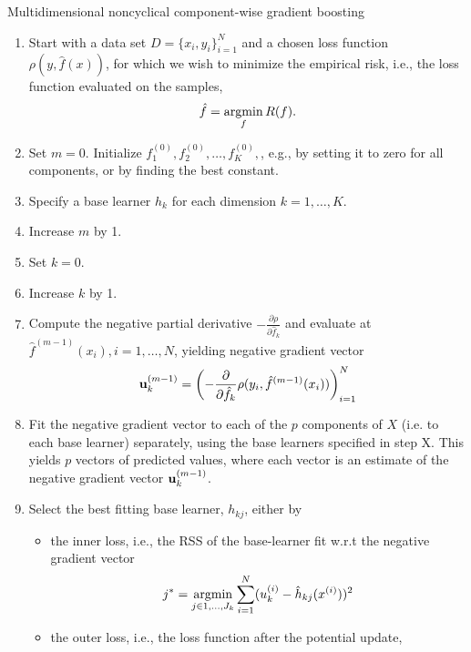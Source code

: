 \begin{algorithm}
\caption{Multidimensional noncyclical component-wise gradient boosting}
\label{algo:multi-noncyclical}
\begin{enumerate}
    \item Start with a data set $D=\{x_i, y_i\}_{i=1}^N$ and a chosen loss function $\rho(y,\hat{f}(x))$, for which we wish to
        minimize the empirical risk, i.e., the loss function evaluated on the samples,
        \begin{equation}
            \hat{f}=\operatorname*{argmin}_{f}R(f).
        \end{equation}
    \item Set $m=0$. Initialize $f^{(0)}_1,f^{(0)}_2,\ldots,f^{(0)}_K,$, e.g., by setting it to zero for all components, or by finding the best constant.%
    \item Specify a base learner $h_k$ for each dimension $k=1,\ldots,K$.
    \item Increase $m$ by 1.
    \item Set $k=0$.
    \item Increase $k$ by 1.
    \item Compute the negative partial derivative $-\frac{\partial\rho}{\partial \hat{f}_k}$
        and evaluate at $\hat{f}^{(m-1)}(x_i),i=1,\ldots,N$, yielding negative gradient vector
        \begin{equation}
            \mathbf{u}^{(m-1)}_k=\left(-\frac{\partial}{\partial \hat{f}_k}\rho(y_i, \hat{f}^{(m-1)}(x_i))\right)_{i=1}^N
        \end{equation}
    \item Fit the negative gradient vector to each of the $p$ components of $X$ (i.e. to each base learner) separately, using the base learners specified in step X. This yields $p$ vectors of predicted values, where each vector is an estimate of the negative gradient vector $\mathbf{u}^{(m-1)}_k$.
    \item Select the best fitting base learner, $h_{kj}$, either by
        \begin{itemize}
            \item the inner loss, i.e., the RSS of the base-learner fit w.r.t the negative gradient vector
                \begin{equation}
                    j^*=\operatorname*{argmin}_{j\in 1,\ldots,J_k}\sum_{i=1}^N(u_k^{(i)}-\hat{h}_{kj}(x^{(i)}))^2
                \end{equation}
            \item the outer loss, i.e., the loss function after the potential update,

\end{itemize}
\end{enumerate}
\end{algorithm}
